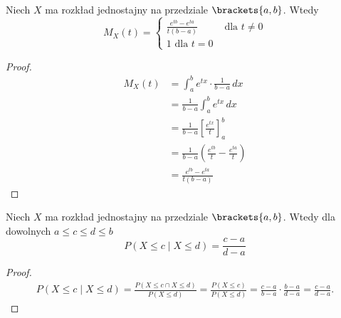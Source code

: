 \begin{theorem}
	Niech \( X \) ma rozkład jednostajny na przedziale \( \brackets{a, b} \). Wtedy
	\[
		M_X(t) = \begin{cases}
			\frac{e^{tb} - e^{ta}}{t(b-a)} & \text{ dla } t \neq 0 \\
			1 \text{ dla } t = 0
		\end{cases}
	\]
\end{theorem}
\begin{proof}
	\begin{align*}
		M_X(t) & = \int_{a}^{b} e^{tx} \cdot \frac{1}{b-a} \, dx                    \\
		       & = \frac{1}{b-a} \int_{a}^{b} e^{tx} \, dx                          \\
		       & = \frac{1}{b-a} \left[ \frac{e^{tx}}{t} \right]_{a}^{b}            \\
		       & = \frac{1}{b-a} \left( \frac{e^{tb}}{t} - \frac{e^{ta}}{t} \right) \\
		       & = \frac{e^{tb} - e^{ta}}{t(b-a)}
	\end{align*}
\end{proof}

\begin{theorem}
	Niech \( X \) ma rozkład jednostajny na przedziale \( \brackets{a, b} \). Wtedy dla dowolnych \( a \leq c \leq d \leq b \)
	\[
		P(X \leq c \mid X \leq d) = \frac{c - a}{d - a}
	\]
\end{theorem}
\begin{proof}
	\begin{align*}
		P(X \leq c \mid X \leq d) = \frac{P\left( X\le c \cap X\le d  \right) }{P\left( X\le d  \right) } = \frac{P\left( X\le c  \right) }{P\left( X\le d  \right) } = \frac{c-a}{b-a} \cdot \frac{b-a}{d-a} = \frac{c-a}{d-a}.
	\end{align*}
\end{proof}

